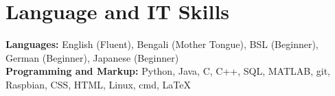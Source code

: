 \documentclass{article}
\begin{document}


\section*{Language and IT Skills}
\textbf{Languages:} English (Fluent), Bengali (Mother Tongue), 
BSL (Beginner), German (Beginner), 
Japanese (Beginner) \\
\textbf{Programming and Markup:} Python, Java, C, C++, SQL, MATLAB, git, Raspbian, CSS, HTML, Linux, cmd, \LaTeX\smallskip

\vspace{-.75\baselineskip}
\hrulefill
\vspace{-.75\baselineskip}
\end{document}
